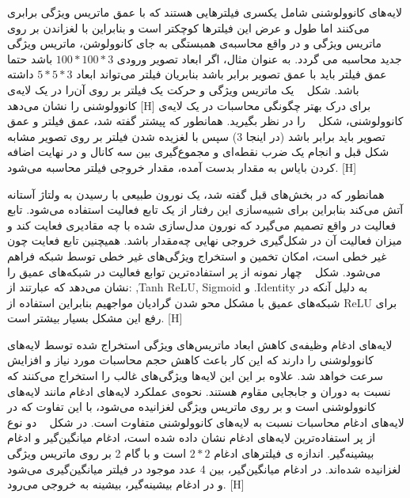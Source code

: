 لایه‌های کانوولوشنی شامل یکسری فیلترهایی هستند که با عمق ماتریس ویژگی برابری می‌کنند اما طول‌ و عرض این فیلترها کوچکتر است و بنابراین با لغزاندن بر روی ماتریس ویژگی و در واقع محاسبه‌ی همبستگی به جای کانوولوشن، ماتریس ویژگی جدید محاسبه‌ می گردد. به عنوان مثال، اگر ابعاد تصویر ورودی $100*100*3$ باشد حتما عمق فیلتر باید با عمق تصویر برابر باشد بنابریان فیلتر می‌تواند ابعاد $5*5*3$ داشته باشد. شکل ~ یک ماتریس ویژگی و حرکت یک فیلتر بر روی آن‌را در یک لایه‌ی کانوولوشنی را نشان می‌دهد
[H]
برای درک بهتر چگونگی محاسبات در یک لایه‌ی کانوولوشنی، شکل ~ را در نظر بگیرید. همانطور که پیشتر گفته شد، عمق فیلتر و عمق تصویر باید برابر باشد (در اینجا 3) سپس با لغزیده شدن فیلتر بر روی تصویر مشابه شکل قبل و انجام یک ضرب نقطه‌ای و مجموع‌گیری بین سه کانال و در نهایت اضافه کردن بایاس به مقدار بدست آمده، مقدار خروجی فیلتر محاسبه می‌شود.
[H]

همانطور که در بخش‌های قبل گفته شد، یک نورون طبیعی با رسیدن به ولتاژ آستانه آتش می‌کند بنابراین برای شبیه‌سازی این رفتار از یک تابع فعالیت استفاده می‌شود. تابع فعالیت در واقع تصمیم می‌گیرد که نورون مدل‌سازی شده با چه مقادیری فعایت کند و میزان فعالیت آن در شکل‌گیری خروجی نهایی چه‌مقدار باشد. همیچنین تابع فعایت چون غیر خطی است، امکان تخمین و استخراج ویژگی‌های غیر خطی توسط شبکه فراهم می‌شود. شکل ~ چهار نمونه از پر استفاده‌ترین توابع فعالیت در شبکه‌های عمیق را نشان می‌دهد که عبارتند از: ,Tanh
ReLU,
 Sigmoid و .Identity به دلیل آنکه در شبکه‌های عمیق با مشکل محو شدن گرادیان مواجهیم بنابراین استفاده از ReLU برای رفع این مشکل بسیار بیشتر است.
[H]

لایه‌های ادغام وظیفه‌ی کاهش ابعاد ماتریس‌های ویژگی استخراج شده توسط لایه‌های کانوولوشنی را دارند که این کار باعث کاهش حجم محاسبات مورد نیاز و افزایش سرعت خواهد شد. علاوه بر این این لایه‌ها ویژگی‌های غالب را استخراج می‌کنند که نسبت به دوران و جابجایی مقاوم هستند. نحوه‌ی عملکرد لایه‌های ادغام مانند لایه‌های کانوولوشنی است و بر روی ماتریس ویژگی لغزانیده می‌شود، با این تفاوت که در لایه‌های ادغام محاسبات نسبت به لایه‌های کانوولوشنی متفاوت است. در شکل ~ دو نوع از پر استفاده‌ترین لایه‌های ادغام نشان داده شده است، ادغام میانگین‌گیر و ادغام بیشینه‌گیر. اندازه ی فیلترهای ادغام $2*2$ است و با گام 2 بر روی ماتریس ویژگی لغزانیده شده‌اند. در ادغام میانگین‌گیر، بین 4 عدد موجود در فیلتر میانگین‌گیری می‌شود و در ادغام بیشینه‌گیر، بیشینه به خروجی می‌رود.
[H]

